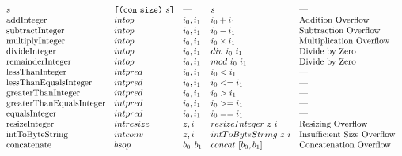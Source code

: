 \documentclass[../main.tex]{subfiles}
\begin{document}
\begin{figure*}[t]
\[\begin{array}{lllll}
        s     & \texttt{[} \texttt{(} \texttt{con} ~ \texttt{size} \texttt{)} ~ s \texttt{]}         &   \textrm{---}   &    s      &   \textrm{---}\\
        
        \mathrm{addInteger}        &  intop  &  i_0 , i_1   &   i_0 + i_1         &   \textrm{Addition Overflow}       \\
        \mathrm{subtractInteger}   &  intop  &  i_0 , i_1   &   i_0 - i_1         &   \textrm{Subtraction Overflow}    \\
        \mathrm{multiplyInteger}   &  intop  &  i_0 , i_1   &   i_0 \times i_1    &   \textrm{Multiplication Overflow} \\
        \mathrm{divideInteger}     &  intop  &  i_0 , i_1   &   div ~ i_0 ~ i_1   &   \textrm{Divide by Zero}          \\
        \mathrm{remainderInteger}  &  intop  &  i_0 , i_1   &   mod ~ i_0 ~ i_1   &   \textrm{Divide by Zero}          \\
        
        \mathrm{lessThanInteger}            &  intpred  &  i_0 , i_1   &   i_0 < i_1    &   \textrm{---}         \\
        \mathrm{lessThanEqualsInteger}      &  intpred  &  i_0 , i_1   &   i_0 <= i_1   &   \textrm{---}         \\
        \mathrm{greaterThanInteger}         &  intpred  &  i_0 , i_1   &   i_0 > i_1    &   \textrm{---}         \\
        \mathrm{greaterThanEqualsInteger}   &  intpred  &  i_0 , i_1   &   i_0 >= i_1   &   \textrm{---}         \\
        \mathrm{equalsInteger}              &  intpred  &  i_0 , i_1   &   i_0 == i_1   &   \textrm{---}         \\
        
        \mathrm{resizeInteger}   &  intresize  &   z, i   &   resizeInteger ~ z ~ i   &   \textrm{Resizing Overflow} \\
        
        \mathrm{intToByteString}  &   intconv  &  z, i           &   intToByteString ~ z ~ i   &   \textrm{Insufficient Size Overflow} \\
        
        
        \mathrm{concatenate}   &   bsop   &   b_0 , b_1   & concat ~ [b_0,b_1]   &   \textrm{Concatenation Overflow} \\
        

\end{array}\]
\end{figure*}
\end{document}
